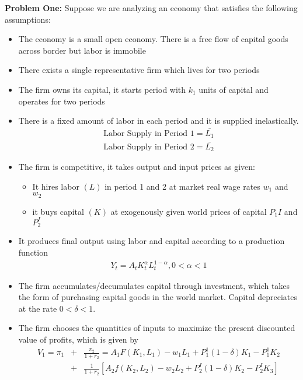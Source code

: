 \documentclass[11pt]{SelfArxOneColBMN}
\affiliation{\textsuperscript{1}\textit{John E. Walker Department of Economics,
Clemson University,Clemson, SC: email ijdavis@g.clemson.edu}}
\date{\small{Version ~\today}}
\begin{document}
\flushbottom

\maketitle

\renewcommand{\theexercise}{\arabic{exercise}}%

\textbf{Problem One:}
Suppose we are analyzing an economy that satisfies the following assumptions:
\begin{itemize}
  \item The economy is a small open economy. There is a free flow of capital goods across border but labor is immobile
  \item There exists a single representative firm which lives for two periods
  \item The firm owns its capital, it starts period with $k_1$ units of capital and operates for two periods
  \item There is a fixed amount of labor in each period and it is supplied inelastically.
  \begin{eqnarray*}
    \text{Labor Supply in Period 1} = \bar{L_1}\\
    \text{Labor Supply in Period 2} = \bar{L_2}
  \end{eqnarray*}
  \item The firm is competitive, it takes output and input prices as given:
  \begin{itemize}
    \item It hires labor $(L)$ in period 1 and 2 at market real wage rates $w_1$ and $w_2$
    \item it buys capital $(K)$ at exogenously given world prices of capital $P_1I$ and $P_2^I$
  \end{itemize}
  \item It produces final output using labor and capital according to a production function
  \begin{eqnarray*}
    Y_t = A_t K_t^\alpha L_t^{1 - \alpha}, 0 < \alpha < 1
  \end{eqnarray*}
  \item The firm accumulates/decumulates capital through investment, which takes the form of purchasing capital goods in the world market. Capital depreciates at the rate $0 < \delta < 1$.
  \item The firm chooses the quantities of inputs to maximize the present discounted value of profits, which is given by
  \begin{eqnarray*}
    V_1 = \pi_1 &+& \frac{\pi_2}{1 + r_2} = A_1F(K_1,L_1) - w_1L_1 + P_1^1(1 - \delta)K_1 - P_1^1K_2\\
     &+& \frac{1}{1 + r_2}[A_2f(K_2,L_2) - w_2L_2 + P_2^I(1 - \delta)K_2 - P_2^IK_3]
  \end{eqnarray*}
\end{itemize}
\end{document}
